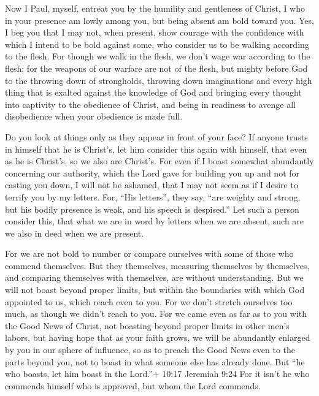  Now I Paul, myself, entreat you by the humility and
gentleness of Christ, I who in your presence am lowly among you, but
being absent am bold toward you.  Yes, I beg you that I may
not, when present, show courage with the confidence with which I intend
to be bold against some, who consider us to be walking according to the
flesh.  For though we walk in the flesh, we don't wage war
according to the flesh;  for the weapons of our warfare are
not of the flesh, but mighty before God to the throwing down of
strongholds,  throwing down imaginations and every high
thing that is exalted against the knowledge of God and bringing every
thought into captivity to the obedience of Christ,  and
being in readiness to avenge all disobedience when your obedience is
made full.

 Do you look at things only as they appear in front of your
face? If anyone trusts in himself that he is Christ's, let him consider
this again with himself, that even as he is Christ's, so we also are
Christ's.  For even if I boast somewhat abundantly
concerning our authority, which the Lord gave for building you up and
not for casting you down, I will not be ashamed,  that I may
not seem as if I desire to terrify you by my letters.  For,
``His letters'', they say, ``are weighty and strong, but his bodily
presence is weak, and his speech is despised.''  Let such a
person consider this, that what we are in word by letters when we are
absent, such are we also in deed when we are present.

 For we are not bold to number or compare ourselves with
some of those who commend themselves. But they themselves, measuring
themselves by themselves, and comparing themselves with themselves, are
without understanding.  But we will not boast beyond proper
limits, but within the boundaries with which God appointed to us, which
reach even to you.  For we don't stretch ourselves too
much, as though we didn't reach to you. For we came even as far as to
you with the Good News of Christ,  not boasting beyond
proper limits in other men's labors, but having hope that as your faith
grows, we will be abundantly enlarged by you in our sphere of influence,
 so as to preach the Good News even to the parts beyond
you, not to boast in what someone else has already done. 
But ``he who boasts, let him boast in the Lord.''+ 10:17 Jeremiah 9:24
 For it isn't he who commends himself who is approved, but
whom the Lord commends.

